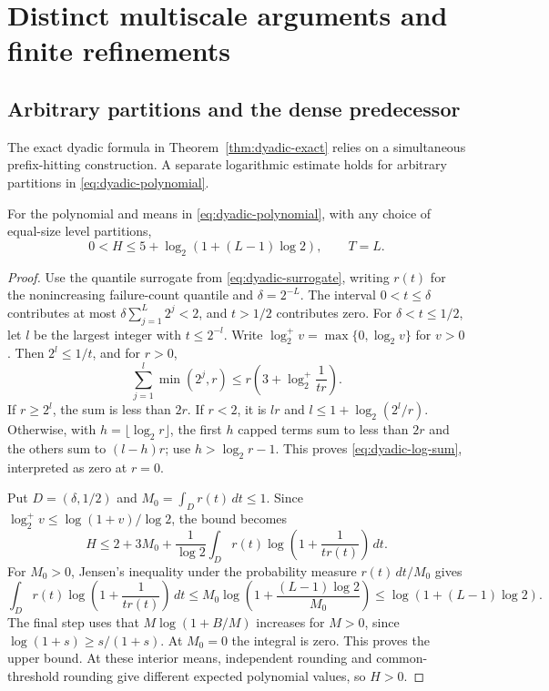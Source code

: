 \section{Distinct multiscale arguments and finite refinements}
\label{app:dyadic-alternatives}
\subsection{Arbitrary partitions and the dense predecessor}
The exact dyadic formula in Theorem~\ref{thm:dyadic-exact} relies on a
simultaneous prefix-hitting construction. A separate logarithmic estimate
holds for arbitrary partitions in \eqref{eq:dyadic-polynomial}.

\begin{proposition}
\label{prop:arbitrary-dyadic}
For the polynomial and means in \eqref{eq:dyadic-polynomial}, with any
choice of equal-size level partitions,
\[
 0<H\le5+\log_2(1+(L-1)\log2),\qquad T=L.
\]
\end{proposition}
\begin{proof}
Use the quantile surrogate from \eqref{eq:dyadic-surrogate}, writing
$r(t)$ for the nonincreasing failure-count quantile and $\delta=2^{-L}$.
The interval $0<t\le\delta$ contributes at most
$\delta\sum_{j=1}^L2^j<2$, and $t>1/2$ contributes zero. For
$\delta<t\le1/2$, let $l$ be the largest integer with $t\le2^{-l}$.
Write $\log_2^+v=\max\{0,\log_2v\}$ for $v>0$.
Then $2^l\le1/t$, and for $r>0$,
\begin{equation}\label{eq:dyadic-log-sum}
 \sum_{j=1}^l\min(2^j,r)
 \le r\left(3+\log_2^+\frac1{tr}\right).
\end{equation}
If $r\ge2^l$, the sum is less than $2r$. If $r<2$, it is $lr$ and
$l\le1+\log_2(2^l/r)$. Otherwise, with $h=\lfloor\log_2r\rfloor$,
the first $h$ capped terms sum to less than $2r$ and the others sum to
$(l-h)r$; use $h>\log_2r-1$. This proves
\eqref{eq:dyadic-log-sum}, interpreted as zero at $r=0$.

Put $D=(\delta,1/2)$ and $M_0=\int_Dr(t)\,dt\le1$. Since
$\log_2^+v\le\log(1+v)/\log2$, the bound becomes
\[
 H\le2+3M_0+\frac1{\log2}
       \int_Dr(t)\log\left(1+\frac1{tr(t)}\right)\,dt.
\]
For $M_0>0$, Jensen's inequality under the probability measure
$r(t)\,dt/M_0$ gives
\[
 \int_Dr(t)\log\left(1+\frac1{tr(t)}\right)\,dt
 \le M_0\log\left(1+\frac{(L-1)\log2}{M_0}\right)
 \le\log(1+(L-1)\log2).
\]
The final step uses that $M\log(1+B/M)$ increases for $M>0$, since
$\log(1+s)\ge s/(1+s)$. At $M_0=0$ the integral is zero. This proves
the upper bound. At these interior means, independent rounding and
common-threshold rounding give different expected polynomial values,
so $H>0$.
\end{proof}

